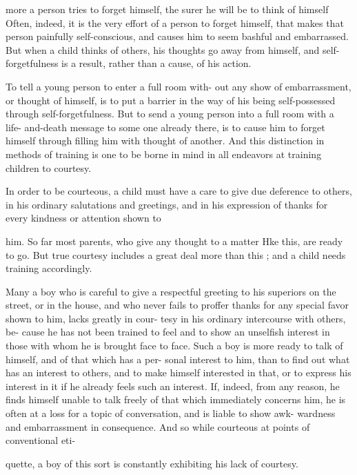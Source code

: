 \documentclass[
]{book}
\begin{document}
more a person tries to forget himself, the surer he will be to think of himself Often, indeed, it is the very effort of a person to forget himself, that makes that person painfully self-conscious, and causes him to seem bashful and embarrassed. But when a child thinks of others, his thoughts go away from himself, and self-forgetfulness is a result, rather than a cause, of his action.

To tell a young person to enter a full room with- out any show of embarrassment, or thought of himself, is to put a barrier in the way of his being self-possessed through self-forgetfulness. But to send a young person into a full room with a life- and-death message to some one already there, is to cause him to forget himself through filling him with thought of another. And this distinction in methods of training is one to be borne in mind in all endeavors at training children to courtesy.

In order to be courteous, a child must have a care to give due deference to others, in his ordinary salutations and greetings, and in his expression of thanks for every kindness or attention shown to

him. So far most parents, who give any thought to a matter Hke this, are ready to go. But true courtesy includes a great deal more than this ; and a child needs training accordingly.

Many a boy who is careful to give a respectful greeting to his superiors on the street, or in the house, and who never fails to proffer thanks for any special favor shown to him, lacks greatly in cour- tesy in his ordinary intercourse with others, be- cause he has not been trained to feel and to show an unselfish interest in those with whom he is brought face to face. Such a boy is more ready to talk of himself, and of that which has a per- sonal interest to him, than to find out what has an interest to others, and to make himself interested in that, or to express his interest in it if he already feels such an interest. If, indeed, from any reason, he finds himself unable to talk freely of that which immediately concerns him, he is often at a loss for a topic of conversation, and is liable to show awk- wardness and embarrassment in consequence. And so while courteous at points of conventional eti-

quette, a boy of this sort is constantly exhibiting his lack of courtesy.
\end{document}
